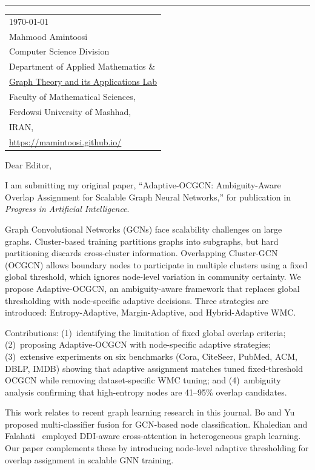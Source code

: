 \documentclass{article}
\begin{document}
\vspace{-1em}

\rule{\linewidth}{1pt}

\bigskip

\hfill
\begin{tabular}{l @{}}
	\today \bigskip\\
Mahmood Amintoosi\\
Computer Science Division\\
Department of Applied Mathematics \&\\
\href{https://gta-lab.github.io/}{Graph Theory and its Applications Lab} \\
Faculty of Mathematical Sciences,\\ Ferdowsi University of Mashhad,\\
IRAN,\\
\url{https://mamintoosi.github.io/}
\end{tabular}

\bigskip

Dear Editor,

I am submitting my original paper, ``Adaptive-OCGCN: Ambiguity-Aware Overlap Assignment for Scalable Graph Neural Networks,'' for publication in \textit{Progress in Artificial Intelligence}.

Graph Convolutional Networks (GCNs) face scalability challenges on large graphs. Cluster-based training partitions graphs into subgraphs, but hard partitioning discards cross-cluster information. Overlapping Cluster-GCN (OCGCN) allows boundary nodes to participate in multiple clusters using a fixed global threshold, which ignores node-level variation in community certainty. We propose Adaptive-OCGCN, an ambiguity-aware framework that replaces global thresholding with node-specific adaptive decisions. Three strategies are introduced: Entropy-Adaptive, Margin-Adaptive, and Hybrid-Adaptive WMC.

Contributions: (1)~identifying the limitation of fixed global overlap criteria; (2)~proposing Adaptive-OCGCN with node-specific adaptive strategies; (3)~extensive experiments on six benchmarks (Cora, CiteSeer, PubMed, ACM, DBLP, IMDB) showing that adaptive assignment matches tuned fixed-threshold OCGCN while removing dataset-specific WMC tuning; and (4)~ambiguity analysis confirming that high-entropy nodes are 41--95\% overlap candidates.

This work relates to recent graph learning research in this journal. Bo and Yu~\cite{Bo2025} proposed multi-classifier fusion for GCN-based node classification. Khaledian and Falahati~\cite{Khaledian2026} employed DDI-aware cross-attention in heterogeneous graph learning. Our paper complements these by introducing node-level adaptive thresholding for overlap assignment in scalable GNN training.
\end{document}
